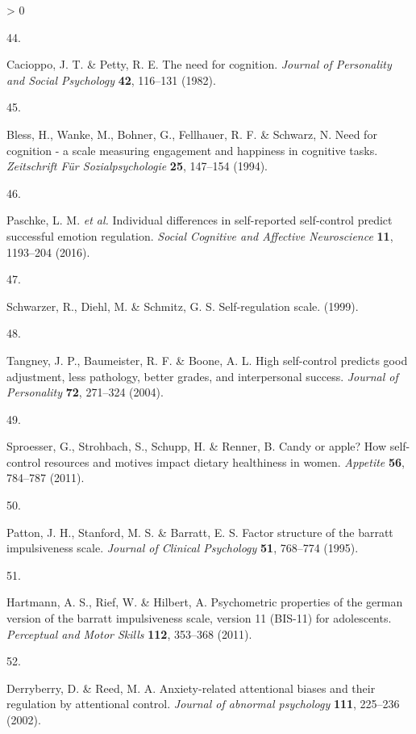 \documentclass[
  english,
  man,floatsintext]{apa6}
\newlength{\cslhangindent}
\newlength{\csllabelwidth}
\newenvironment{CSLReferences}[2] %
 {%
  \setlength{\parindent}{0pt}
  \ifodd #1 \everypar{\setlength{\hangindent}{\cslhangindent}}\ignorespaces\fi
  \ifnum #2 > 0
  \setlength{\parskip}{#2\baselineskip}
  \fi
 }%
 {}
\newcommand{\CSLLeftMargin}[1]{\parbox[t]{\csllabelwidth}{#1}}
\newcommand{\CSLRightInline}[1]{\parbox[t]{\linewidth - \csllabelwidth}{#1}\break}
\begin{document}
\begin{CSLReferences}{0}{0}
\leavevmode\hypertarget{ref-Cacioppo1982}{}%
\CSLLeftMargin{44. }
\CSLRightInline{Cacioppo, J. T. \& Petty, R. E. The need for cognition. \emph{Journal of Personality and Social Psychology} \textbf{42}, 116--131 (1982).}

\leavevmode\hypertarget{ref-Bless1994}{}%
\CSLLeftMargin{45. }
\CSLRightInline{Bless, H., Wanke, M., Bohner, G., Fellhauer, R. F. \& Schwarz, N. Need for cognition - a scale measuring engagement and happiness in cognitive tasks. \emph{Zeitschrift Für Sozialpsychologie} \textbf{25}, 147--154 (1994).}

\leavevmode\hypertarget{ref-Paschke2016}{}%
\CSLLeftMargin{46. }
\CSLRightInline{Paschke, L. M. \emph{et al.} Individual differences in self-reported self-control predict successful emotion regulation. \emph{Social Cognitive and Affective Neuroscience} \textbf{11}, 1193--204 (2016).}

\leavevmode\hypertarget{ref-Schwarzer1999}{}%
\CSLLeftMargin{47. }
\CSLRightInline{Schwarzer, R., Diehl, M. \& Schmitz, G. S. Self-regulation scale. (1999).}

\leavevmode\hypertarget{ref-Tangney2004}{}%
\CSLLeftMargin{48. }
\CSLRightInline{Tangney, J. P., Baumeister, R. F. \& Boone, A. L. High self-control predicts good adjustment, less pathology, better grades, and interpersonal success. \emph{Journal of Personality} \textbf{72}, 271--324 (2004).}

\leavevmode\hypertarget{ref-Sproesser2011}{}%
\CSLLeftMargin{49. }
\CSLRightInline{Sproesser, G., Strohbach, S., Schupp, H. \& Renner, B. Candy or apple? How self-control resources and motives impact dietary healthiness in women. \emph{Appetite} \textbf{56}, 784--787 (2011).}

\leavevmode\hypertarget{ref-Patton1995}{}%
\CSLLeftMargin{50. }
\CSLRightInline{Patton, J. H., Stanford, M. S. \& Barratt, E. S. Factor structure of the barratt impulsiveness scale. \emph{Journal of Clinical Psychology} \textbf{51}, 768--774 (1995).}

\leavevmode\hypertarget{ref-Hartmann2011}{}%
\CSLLeftMargin{51. }
\CSLRightInline{Hartmann, A. S., Rief, W. \& Hilbert, A. Psychometric properties of the german version of the barratt impulsiveness scale, version 11 (BIS-11) for adolescents. \emph{Perceptual and Motor Skills} \textbf{112}, 353--368 (2011).}

\leavevmode\hypertarget{ref-Derryberry2002}{}%
\CSLLeftMargin{52. }
\CSLRightInline{Derryberry, D. \& Reed, M. A. Anxiety-related attentional biases and their regulation by attentional control. \emph{Journal of abnormal psychology} \textbf{111}, 225--236 (2002).}


\end{CSLReferences}
\end{document}
